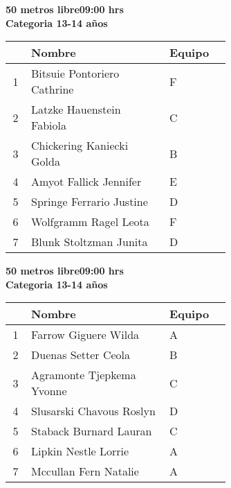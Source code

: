 \begin{minipage}{0.95\linewidth}\vspace{0.5cm} 
\begin{flushleft}
\textbf{
\hspace{-0.15cm}50 metros libre\hspace{1.5cm}09:00 hrs \\Categoria 13-14 años}\vspace{-0.2cm} 
\end{flushleft}
\begin{tabular}{cp{0.63\linewidth}l}
\hline
& \textbf{Nombre} & \textbf{Equipo} \\ \hline
1 & Bitsuie Pontoriero Cathrine & F \\ 
2 & Latzke Hauenstein Fabiola & C \\ 
3 & Chickering Kaniecki Golda & B \\ 
4 & Amyot Fallick Jennifer & E \\ 
5 & Springe Ferrario Justine & D \\ 
6 & Wolfgramm Ragel Leota & F \\ 
7 & Blunk Stoltzman Junita & D \\ 
\end{tabular}
\end{minipage}
\begin{minipage}{0.95\linewidth}\vspace{0.5cm} 
\begin{flushleft}
\textbf{
\hspace{-0.15cm}50 metros libre\hspace{1.5cm}09:00 hrs \\Categoria 13-14 años}\vspace{-0.2cm} 
\end{flushleft}
\begin{tabular}{cp{0.63\linewidth}l}
\hline
& \textbf{Nombre} & \textbf{Equipo} \\ \hline
1 & Farrow Giguere Wilda & A \\ 
2 & Duenas Setter Ceola & B \\ 
3 & Agramonte Tjepkema Yvonne & C \\ 
4 & Slusarski Chavous Roslyn & D \\ 
5 & Staback Burnard Lauran & C \\ 
6 & Lipkin Nestle Lorrie & A \\ 
7 & Mccullan Fern Natalie & A \\ 
\end{tabular}
\end{minipage}
